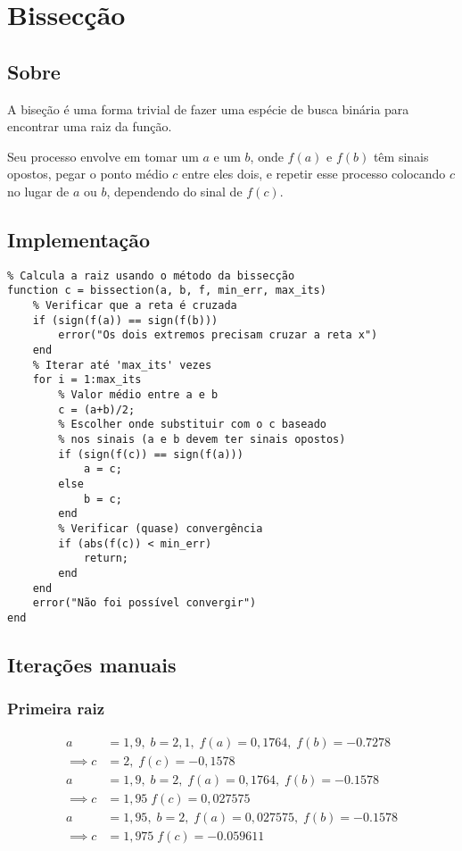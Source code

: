 \documentclass[12pt]{article}
\begin{document}
\section{Bissecção}
\subsection{Sobre}
A biseção é uma forma trivial de fazer uma espécie de busca binária para encontrar uma raiz da função.

Seu processo envolve em tomar um \(a\) e um \(b\), onde \(f(a)\) e \(f(b)\) têm sinais opostos, pegar o ponto médio \(c\) entre eles dois, e repetir esse processo colocando \(c\) no lugar de \(a\) ou \(b\), dependendo do sinal de \(f(c)\).

\subsection{Implementação}
\begin{verbatim}
% Calcula a raiz usando o método da bissecção
function c = bissection(a, b, f, min_err, max_its)
    % Verificar que a reta é cruzada
    if (sign(f(a)) == sign(f(b)))
        error("Os dois extremos precisam cruzar a reta x")
    end
    % Iterar até 'max_its' vezes
    for i = 1:max_its
        % Valor médio entre a e b
        c = (a+b)/2;
        % Escolher onde substituir com o c baseado
        % nos sinais (a e b devem ter sinais opostos)
        if (sign(f(c)) == sign(f(a)))
            a = c;
        else
            b = c;
        end
        % Verificar (quase) convergência
        if (abs(f(c)) < min_err)
            return;
        end
    end
    error("Não foi possível convergir")
end
\end{verbatim}
\subsection{Iterações manuais}
\subsubsection{Primeira raiz}
\begin{align*}
    a &= 1,9,\; b =2,1,\; f(a) = 0,1764,\; f(b) = -0.7278 \\
    \implies c &= 2,\; f(c) = -0,1578 \\
    a &= 1,9,\; b =2,\; f(a) = 0,1764,\; f(b) = -0.1578 \\
    \implies c &= 1,95\; f(c) = 0,027575 \\
    a &= 1,95,\; b =2,\; f(a) = 0,027575,\; f(b) = -0.1578 \\
    \implies c &= 1,975\; f(c) = -0.059611 \\
\end{align*}
\end{document}
